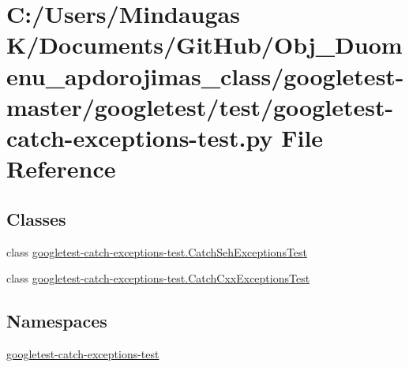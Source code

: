 \hypertarget{googletest-master_2googletest_2test_2googletest-catch-exceptions-test_8py}{}\section{C\+:/\+Users/\+Mindaugas K/\+Documents/\+Git\+Hub/\+Obj\+\_\+\+Duomenu\+\_\+apdorojimas\+\_\+class/googletest-\/master/googletest/test/googletest-\/catch-\/exceptions-\/test.py File Reference}
\label{googletest-master_2googletest_2test_2googletest-catch-exceptions-test_8py}
\subsection*{Classes}
\begin{DoxyCompactItemize}
\item 
class \mbox{\hyperlink{classgoogletest-catch-exceptions-test_1_1_catch_seh_exceptions_test}{googletest-\/catch-\/exceptions-\/test.\+Catch\+Seh\+Exceptions\+Test}}
\item 
class \mbox{\hyperlink{classgoogletest-catch-exceptions-test_1_1_catch_cxx_exceptions_test}{googletest-\/catch-\/exceptions-\/test.\+Catch\+Cxx\+Exceptions\+Test}}
\end{DoxyCompactItemize}
\subsection*{Namespaces}
\begin{DoxyCompactItemize}
\item 
 \mbox{\hyperlink{namespacegoogletest-catch-exceptions-test}{googletest-\/catch-\/exceptions-\/test}}
\end{DoxyCompactItemize}
